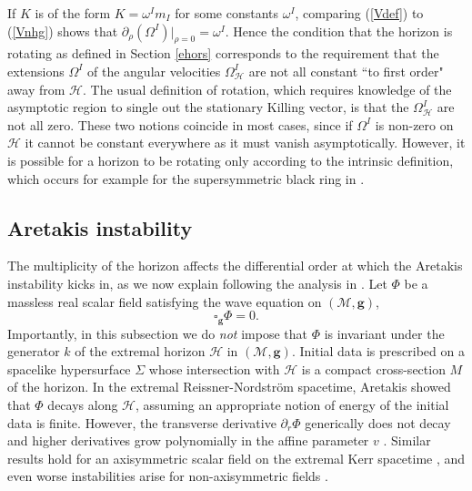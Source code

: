 \documentclass[11pt, reqno]{amsart}
\theoremstyle{plain}
\theoremstyle{definition}
\numberwithin{equation}{section}
\begin{document}
If $K$ is of the form $K = \omega^Im_I$ for some constants $\omega^I$, comparing (\ref{Vdef}) to (\ref{Vnhg}) shows that $\partial_\rho (\Omega^I)\vert_{\rho = 0} = \omega^I$. Hence the condition that the horizon is rotating as defined in Section \ref{ehors} corresponds to the requirement that the extensions $\Omega^I$ of the angular velocities $\Omega^I_{\mathcal{H}}$ are not all constant ``to first order" away from $\mathcal{H}$. The usual definition of rotation, which requires knowledge of the asymptotic region to single out the stationary Killing vector, is that the $\Omega^I_{\mathcal{H}}$ are not all zero. These two notions coincide in most cases, since if $\Omega^I$ is non-zero on $\mathcal{H}$ it cannot be constant everywhere as it must vanish asymptotically. However, it is possible for a horizon to be rotating only according to the intrinsic definition, which occurs for example for the supersymmetric black ring in \cite{EEMR04}.
\subsection{Aretakis instability} \label{secare} The multiplicity of the horizon affects the differential order at which the Aretakis instability kicks in, as we now explain following the analysis in \cite{LR12}. Let $\Phi$ be a massless real scalar field satisfying the wave equation on $(\mathcal{M},\textbf{g})$,
\begin{equation} \label{wave}
    \square_{\textbf{g}}\Phi = 0.
\end{equation}
Importantly, in this subsection we do \textit{not} impose that $\Phi$ is invariant under the generator $k$ of the extremal horizon $\mathcal{H}$ in $(\mathcal{M},\textbf{g})$. Initial data is prescribed on a spacelike hypersurface $\Sigma$ whose intersection with $\mathcal{H}$ is a compact cross-section $M$ of the horizon. In the extremal Reissner-Nordstr\"om spacetime, Aretakis showed that $\Phi$ decays along $\mathcal{H}$, assuming an appropriate notion of energy of the initial data is finite. However, the transverse derivative $\partial_r \Phi$ generically does not decay and higher derivatives grow polynomially in the affine parameter $v$ \cite{A11,A112}. Similar results hold for an axisymmetric scalar field on the extremal Kerr spacetime \cite{A113, A12}, and even worse instabilities arise for non-axisymmetric fields \cite{G23}.
\end{document}
